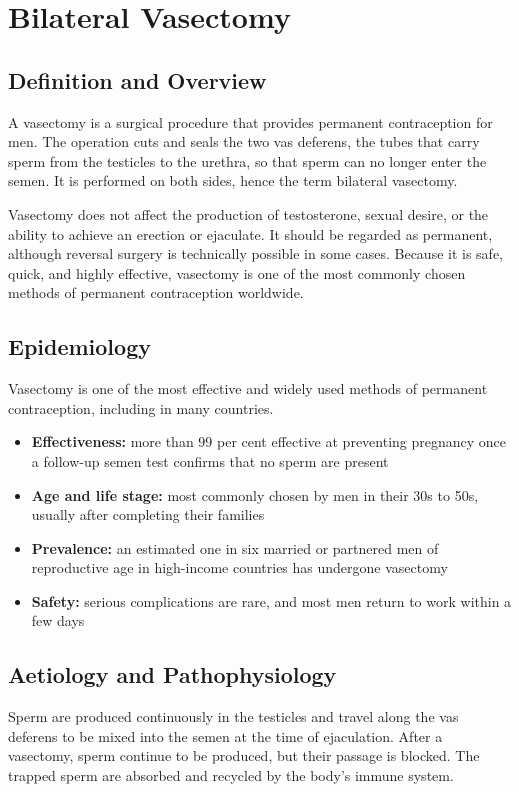 \chapter{Bilateral Vasectomy}

\section*{Definition and Overview}
A vasectomy is a surgical procedure that provides permanent contraception for men. The operation cuts and seals the two vas deferens, the tubes that carry sperm from the testicles to the urethra, so that sperm can no longer enter the semen. It is performed on both sides, hence the term bilateral vasectomy.

Vasectomy does not affect the production of testosterone, sexual desire, or the ability to achieve an erection or ejaculate. It should be regarded as permanent, although reversal surgery is technically possible in some cases. Because it is safe, quick, and highly effective, vasectomy is one of the most commonly chosen methods of permanent contraception worldwide.

\section*{Epidemiology}
Vasectomy is one of the most effective and widely used methods of permanent contraception, including in many countries.

\begin{itemize}
    \item \textbf{Effectiveness:} more than 99 per cent effective at preventing pregnancy once a follow-up semen test confirms that no sperm are present
    \item \textbf{Age and life stage:} most commonly chosen by men in their 30s to 50s, usually after completing their families
    \item \textbf{Prevalence:} an estimated one in six married or partnered men of reproductive age in high-income countries has undergone vasectomy
    \item \textbf{Safety:} serious complications are rare, and most men return to work within a few days
\end{itemize}

\section*{Aetiology and Pathophysiology}
Sperm are produced continuously in the testicles and travel along the vas deferens to be mixed into the semen at the time of ejaculation. After a vasectomy, sperm continue to be produced, but their passage is blocked. The trapped sperm are absorbed and recycled by the body's immune system.

